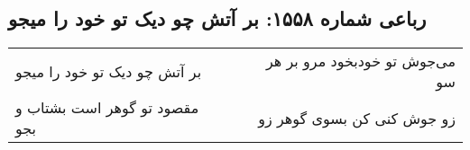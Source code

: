 \begin{center}
\section*{رباعی شماره ۱۵۵۸: بر آتش چو دیک تو خود را میجو}
\label{sec:1558}
\begin{longtable}{l p{0.5cm} r}
بر آتش چو دیک تو خود را میجو
&&
می‌جوش تو خودبخود مرو بر هر سو
\\
مقصود تو گوهر است بشتاب و بجو
&&
زو جوش کنی کن بسوی گوهر زو
\\
\end{longtable}
\end{center}
